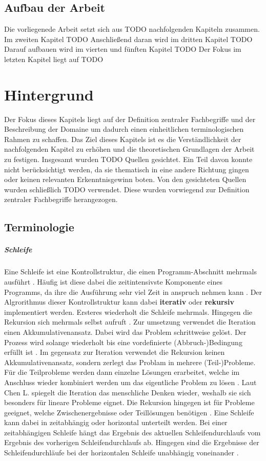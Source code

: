     \section{Aufbau der Arbeit}
    Die vorliegenede Arbeit setzt sich aus TODO nachfolgenden Kapiteln zusammen. 
    Im zweiten Kapitel TODO
    Anschließend daran wird im dritten Kapitel TODO
    Darauf aufbauen wird im vierten und fünften Kapitel TODO
    Der Fokus im letzten Kapitel liegt auf TODO 
    \newpage
    \chapter{Hintergrund}
    Der Fokus dieses Kapitels liegt auf der Definition zentraler Fachbegriffe und der Beschreibung der Domaine um dadurch einen einheitlichen terminologischen Rahmen zu schaffen. 
    Das Ziel dieses Kapitels ist es die Verständlichkeit der nachfolgenden Kapitel zu erhöhen und die theoretischen Grundlagen der Arbeit zu festigen. Insgesamt wurden TODO Quellen gesichtet. 
    Ein Teil davon konnte nicht berücksichtigt werden, da sie thematisch in eine andere Richtung gingen oder keinen relevanten Erkenntnisgewinn boten. 
    Von den gesichteten Quellen wurden schließlich TODO verwendet. 
    Diese wurden vorwiegend zur Definition zentraler Fachbegriffe herangezogen.
    \section{Terminologie}
    \label{Terminologie}
    \paragraph{Schleife}
    Eine Schleife ist eine Kontrollstruktur, die einen Programm-Abschnitt mehrmals ausführt \cite{22}.
    Häufig ist diese dabei die zeitintensivste Komponente eines Programms, da ihre die Ausführung sehr viel Zeit in anspruch nehmen kann \cite{1}.
    Der Algrorithmus dieser Kontrollstruktur kann dabei \textbf{iterativ} oder \textbf{rekursiv} implementiert werden. Ersteres wiederholt die Schleife mehrmals. Hingegen die Rekursion sich mehrmals selbst aufruft \cite{3}.
    Zur umsetzung verwendet die Iteration einen Akkumulativenansatz. Dabei wird das Problem schrittweise gelöst. Der Prozess wird solange wiederholt bis eine vordefinierte (Abbruch-)Bedingung erfüllt ist \cite{3}.
    Im gegensatz zur Iteration verwendet die Rekursion keinen Akkumulativenansatz, sondern zerlegt das Problam in mehrere (Teil-)Probleme. Für die Teilprobleme werden dann einzelne Lösungen erarbeitet, welche im Anschluss wieder kombiniert werden um das eigentliche Problem zu lösen \cite{3}.
    Laut Chen L. spiegelt die Iteration das menschliche Denken wieder, weshalb sie sich besonders für lineare Probleme eignet. 
    Die Rekursion hingegen ist für Probleme geeignet, welche Zwischenergebnisse oder Teillösungen benötigen \cite{3}.
    Eine Schleife kann dabei in zeitabhängig oder horizontal unterteilt werden. Bei einer zeitabhängigen Schleife hängt das Ergebnis des aktuellen Schleifendurchlaufs vom Ergebnis des vorherigen Schleifendurchlaufs ab. Hingegen sind die Ergebnisse der Schleifendurchläufe bei der horizontalen Schleife unabhängig voneinander \cite{5}.
